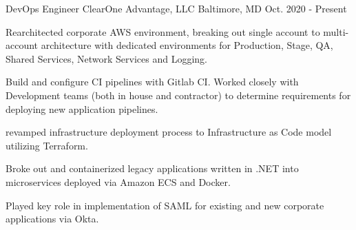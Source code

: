 

\begin{cventries}

  \cventry
    {DevOps Engineer} %
    {ClearOne Advantage, LLC} %
    {Baltimore, MD} %
    {Oct. 2020 - Present} %
    {
      \begin{cvitems} %
        \item {Rearchitected corporate AWS environment, breaking out single account to multi-account architecture with dedicated environments for Production, Stage, QA, Shared Services, Network Services and Logging.}
        \item {Build and configure CI pipelines with Gitlab CI. Worked closely with Development teams (both in house and contractor) to determine requirements for deploying new application pipelines.}
        \item {revamped infrastructure deployment process to Infrastructure as Code model utilizing Terraform.}
        \item {Broke out and containerized legacy applications written in .NET into microservices deployed via Amazon ECS and Docker.}
        \item {Played key role in implementation of SAML for existing and new corporate applications via Okta.}
      \end{cvitems}
    }


\end{cventries}
